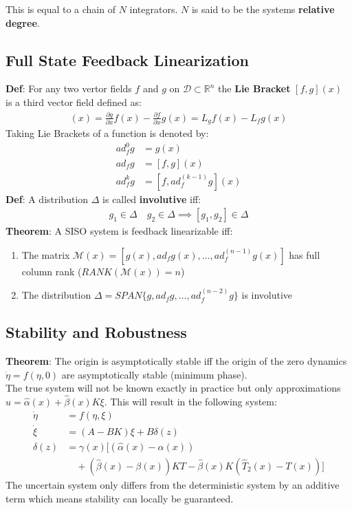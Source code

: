 This is equal to a chain of $N$ integrators. $N$ is said to be the systems \textbf{relative degree}.

\subsection{Full State Feedback Linearization}
\textbf{Def}: For any two vertor fields $f$ and $g$ on $\mathcal{D} \subset \mathbb{R}^n$ the \textbf{Lie Bracket} $[f,g](x)$ is a third vector field defined as:
\begin{align*}
    [f,g](x) = \frac{\partial g}{\partial x}f(x) - \frac{\partial f}{\partial x}g(x) = L_g f(x) - L_f g(x)
\end{align*}
Taking Lie Brackets of a function is denoted by:
\begin{align*}
    ad_f^0g  & = g(x)                 \\
    ad_f g   & = [f,g](x)             \\
    ad_f^k g & = [f,ad_f^{(k-1)}g](x)
\end{align*}
\textbf{Def}: A distribution $\Delta$ is called \textbf{involutive} iff:
\begin{align*}
    g_1\in \Delta \quad g_2\in \Delta \implies [g_1,g_2] \in \Delta
\end{align*}
\textbf{Theorem}: A SISO system is feedback linearizable iff:
\begin{enumerate}
    \item The matrix $\mathcal{M}(x) = [g(x), ad_f g(x), \dots , ad_f^{(n-1)}g(x)]$ has full column rank ($RANK(\mathcal{M}(x)) = n$)
    \item The distribution $\Delta = SPAN\{g, ad_f g, \dots, ad_f^{(n-2)}g \}$ is involutive
\end{enumerate}
\subsection{Stability and Robustness}
\textbf{Theorem}: The origin is asymptotically stable iff the origin of the zero dynamics $\Dot{\eta} = f(\eta,0)$ are asymptotically stable (minimum phase).\\
The true system will not be known exactly in practice but only approximations $u = \hat{\alpha}(x) + \hat{\beta}(x)K\xi$. This will result in the following system:
\begin{align*}
    \Dot{\eta} & = f(\eta,\xi)                                                                   \\
    \Dot{\xi}  & = (A-BK)\xi + B \delta(z)                                                       \\
    \delta(z)  & = \gamma(x) [(\hat{\alpha}(x)-\alpha(x))                                        \\
               & \quad + (\hat{\beta}(x) - \beta(x) ) KT - \hat{\beta}(x)K(\hat{T}_2(x) - T(x))]
\end{align*}
The uncertain system only differs from the deterministic system by an additive term which means stability can locally be guaranteed.

